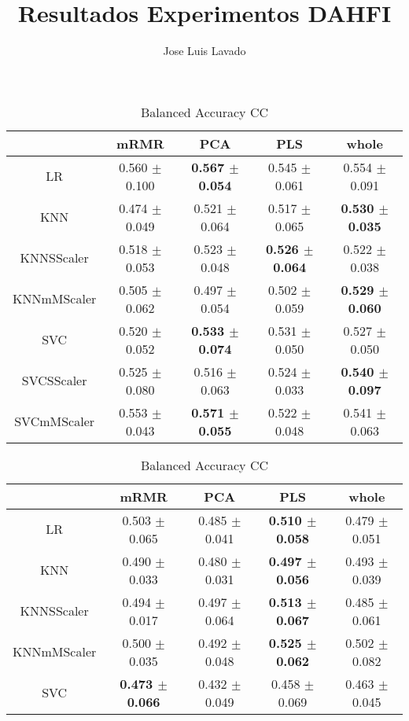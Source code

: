 \documentclass[]{report}
\title{Resultados Experimentos DAHFI}
\author{Jose Luis Lavado}
\begin{document}
\maketitle

	\begin{table}
		\centering
		\setlength{\aboverulesep}{0pt}
		\setlength{\belowrulesep}{0pt}
		\begin{tabular}{c|cccc}
			\hline
			             & mRMR            & PCA             & PLS             & whole           \\
			\hline
			 LR          & 0.560 $\pm$ 0.100 & \textbf{0.567 $\pm$ 0.054} & 0.545 $\pm$ 0.061 & 0.554 $\pm$ 0.091 \\
			 KNN         & 0.474 $\pm$ 0.049 & 0.521 $\pm$ 0.064 & 0.517 $\pm$ 0.065 & \textbf{0.530 $\pm$ 0.035} \\
			 KNNSScaler  & 0.518 $\pm$ 0.053 & 0.523 $\pm$ 0.048 & \textbf{0.526 $\pm$ 0.064} & 0.522 $\pm$ 0.038 \\
			 KNNmMScaler & 0.505 $\pm$ 0.062 & 0.497 $\pm$ 0.054 & 0.502 $\pm$ 0.059 & \textbf{0.529 $\pm$ 0.060} \\
			 SVC         & 0.520 $\pm$ 0.052 & \textbf{0.533 $\pm$ 0.074} & 0.531 $\pm$ 0.050 & 0.527 $\pm$ 0.050 \\
			 SVCSScaler  & 0.525 $\pm$ 0.080 & 0.516 $\pm$ 0.063 & 0.524 $\pm$ 0.033 & \textbf{0.540 $\pm$ 0.097} \\
			 SVCmMScaler & 0.553 $\pm$ 0.043 & \textbf{0.571 $\pm$ 0.055} & 0.522 $\pm$ 0.048 & 0.541 $\pm$ 0.063 \\
			\hline
		\end{tabular}
		\caption{\label{tab:bal_acc_CC} Balanced Accuracy CC}
		\vspace*{2cm}
		\begin{tabular}{c|cccc}
			\hline
			             & mRMR            & PCA             & PLS             & whole           \\
			\hline
			 LR          & 0.503 $\pm$ 0.065 & 0.485 $\pm$ 0.041 & \textbf{0.510 $\pm$ 0.058} & 0.479 $\pm$ 0.051 \\
			 KNN         & 0.490 $\pm$ 0.033 & 0.480 $\pm$ 0.031 & \textbf{0.497 $\pm$ 0.056} & 0.493 $\pm$ 0.039 \\
			 KNNSScaler  & 0.494 $\pm$ 0.017 & 0.497 $\pm$ 0.064 & \textbf{0.513 $\pm$ 0.067} & 0.485 $\pm$ 0.061 \\
			 KNNmMScaler & 0.500 $\pm$ 0.035 & 0.492 $\pm$ 0.048 & \textbf{0.525 $\pm$ 0.062} & 0.502 $\pm$ 0.082 \\
			 SVC         & \textbf{0.473 $\pm$ 0.066} & 0.432 $\pm$ 0.049 & 0.458 $\pm$ 0.069 & 0.463 $\pm$ 0.045 \\

\end{tabular}
\end{table}
\end{document}
